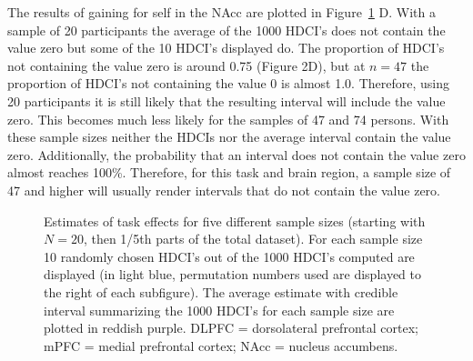 \documentclass[
  letterpaper,
  DIV=11,
  numbers=noendperiod]{scrartcl}
\begin{document}
The results of gaining for self in the NAcc are plotted in
Figure~\ref{fig-1} D. With a sample of 20 participants the average of
the 1000 HDCI's does not contain the value zero but some of the 10
HDCI's displayed do. The proportion of HDCI's not containing the value
zero is around 0.75 (Figure 2D), but at \(n = 47\) the proportion of
HDCI's not containing the value 0 is almost 1.0. Therefore, using 20
participants it is still likely that the resulting interval will include
the value zero. This becomes much less likely for the samples of 47 and
74 persons. With these sample sizes neither the HDCIs nor the average
interval contain the value zero. Additionally, the probability that an
interval does not contain the value zero almost reaches 100\%.
Therefore, for this task and brain region, a sample size of 47 and
higher will usually render intervals that do not contain the value zero.

\begin{figure}[H]


\caption{\label{fig-1}Estimates of task effects for five different
sample sizes (starting with \(N=20\), then 1/5th parts of the total
dataset). For each sample size 10 randomly chosen HDCI's out of the 1000
HDCI's computed are displayed (in light blue, permutation numbers used
are displayed to the right of each subfigure). The average estimate with
credible interval summarizing the 1000 HDCI's for each sample size are
plotted in reddish purple. DLPFC = dorsolateral prefrontal cortex; mPFC
= medial prefrontal cortex; NAcc = nucleus accumbens.}

\end{figure}%
\end{document}
